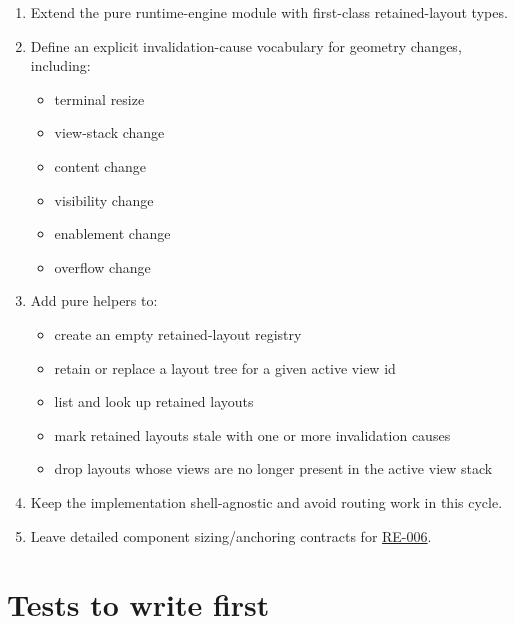 \begin{enumerate}
\def\labelenumi{\arabic{enumi}.}
\tightlist
\item
  Extend the pure runtime-engine module with first-class retained-layout types.
\item
  Define an explicit invalidation-cause vocabulary for geometry changes, including:

  \begin{itemize}
  \tightlist
  \item
    terminal resize
  \item
    view-stack change
  \item
    content change
  \item
    visibility change
  \item
    enablement change
  \item
    overflow change
  \end{itemize}
\item
  Add pure helpers to:

  \begin{itemize}
  \tightlist
  \item
    create an empty retained-layout registry
  \item
    retain or replace a layout tree for a given active view id
  \item
    list and look up retained layouts
  \item
    mark retained layouts stale with one or more invalidation causes
  \item
    drop layouts whose views are no longer present in the active view stack
  \end{itemize}
\item
  Keep the implementation shell-agnostic and avoid routing work in this cycle.
\item
  Leave detailed component sizing/anchoring contracts for \href{https://github.com/flyingrobots/bijou/blob/cbd70612140e7a450d764b3c7be1c6af878b99bc/docs/design/RE-006-formalize-component-layout-and-interaction-contracts.md}{RE-006}.
\end{enumerate}

\section{Tests to write first}\label{record-151-tests-to-write-first}

